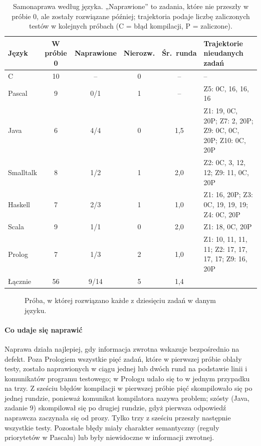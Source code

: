 \begin{table}[htbp]
  \centering
  \caption{Samonaprawa według języka. „Naprawione” to zadania, które nie przeszły w próbie 0, ale
    zostały rozwiązane później; trajektoria podaje liczbę zaliczonych testów w kolejnych próbach
    (C = błąd kompilacji, P = zaliczone).}
  \label{tab:repair}
  \small
  \begin{tabularx}{\textwidth}{@{}lccccY@{}}
    \toprule
    Język & W próbie 0 & Naprawione & Nierozw. & Śr.\ runda & Trajektorie nieudanych zadań \\
    \midrule
    C         & 10 & --       & 0 & --  & -- \\
    Pascal    &  9 & 0/1      & 1 & --  & Z5: 0C, 16, 16, 16 \\
    Java      &  6 & 4/4      & 0 & 1,5 & Z1: 19, 0C, 20P; Z7: 2, 20P; Z9: 0C, 0C, 20P; Z10: 0C, 20P \\
    Smalltalk &  8 & 1/2      & 1 & 2,0 & Z2: 0C, 3, 12, 12; Z9: 11, 0C, 20P \\
    Haskell   &  7 & 2/3      & 1 & 1,0 & Z1: 16, 20P; Z3: 0C, 19, 19, 19; Z4: 0C, 20P \\
    Scala     &  9 & 1/1      & 0 & 2,0 & Z1: 18, 0C, 20P \\
    Prolog    &  7 & 1/3      & 2 & 1,0 & Z1: 10, 11, 11, 11; Z2: 17, 17, 17, 17; Z9: 16, 20P \\
    \midrule
    Łącznie   & 56 & 9/14     & 5 & 1,4 & \\
    \bottomrule
  \end{tabularx}
\end{table}

\begin{figure}[htbp]
  \centering
  
  \caption{Próba, w której rozwiązano każde z dziesięciu zadań w danym języku.}
  \label{fig:repair}
\end{figure}

\paragraph{Co udaje się naprawić} Naprawa działa najlepiej, gdy informacja zwrotna wskazuje
bezpośrednio na defekt. Poza Prologiem wszystkie pięć zadań, które w pierwszej próbie oblały testy,
zostało naprawionych w ciągu jednej lub dwóch rund na podstawie linii \code{[FAIL]}
i komunikatów programu testowego; w Prologu udało się to w jednym przypadku na trzy. Z sześciu błędów
kompilacji w pierwszej próbie pięć skompilowało się po jednej rundzie, ponieważ komunikat
kompilatora nazywa problem; szósty (Java, zadanie 9) skompilował się po drugiej rundzie, gdyż
pierwsza odpowiedź naprawcza zaczynała się od prozy. Tylko trzy z sześciu przeszły następnie
wszystkie testy. Pozostałe błędy miały charakter semantyczny (reguły priorytetów w Pascalu) lub
były niewidoczne w informacji zwrotnej.

